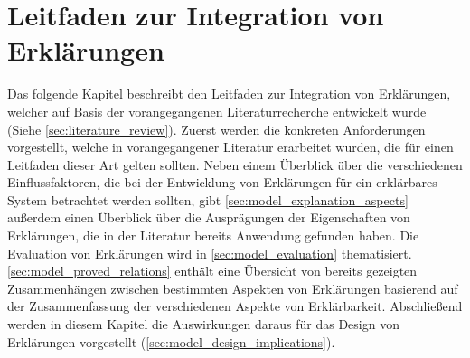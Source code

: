 \chapter{Leitfaden zur Integration von Erklärungen}

Das folgende Kapitel beschreibt den Leitfaden zur Integration von Erklärungen, welcher auf Basis der vorangegangenen Literaturrecherche entwickelt wurde (Siehe \autoref{sec:literature_review}). Zuerst werden die konkreten Anforderungen vorgestellt, welche in vorangegangener Literatur erarbeitet wurden, die für einen Leitfaden dieser Art gelten sollten. Neben einem Überblick über die verschiedenen Einflussfaktoren, die bei der Entwicklung von Erklärungen für ein erklärbares System betrachtet werden sollten, gibt \autoref{sec:model_explanation_aspects} außerdem einen Überblick über die Ausprägungen der Eigenschaften von Erklärungen, die in der Literatur bereits Anwendung gefunden haben. Die Evaluation von Erklärungen wird in \autoref{sec:model_evaluation} thematisiert. \autoref{sec:model_proved_relations} enthält eine Übersicht von bereits gezeigten Zusammenhängen zwischen bestimmten Aspekten von Erklärungen basierend auf der Zusammenfassung der verschiedenen Aspekte von Erklärbarkeit. Abschließend werden in diesem Kapitel die Auswirkungen daraus für das Design von Erklärungen vorgestellt (\autoref{sec:model_design_implications}).

% 





